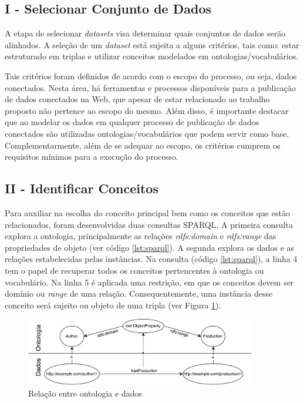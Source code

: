 \subsection{I - Selecionar Conjunto de Dados}
A etapa de selecionar \textit{datasets} visa determinar quais conjuntos de dados serão alinhados. A seleção de um \textit{dataset} está sujeita a alguns critérios, tais como: estar estruturado em triplas e utilizar conceitos modelados em ontologias/vocabulários. 

Tais critérios foram definidos de acordo com o escopo do processo, ou seja, dados conectados. Nesta área, há ferramentas e processos disponíveis para a publicação de dados conectados na Web, que apesar de estar relacionado ao trabalho proposto não pertence ao escopo do mesmo. Além disso, é importante destacar que ao modelar os dados em qualquer processo de publicação de dados conectados são utilizadas ontologias/vocabulários que podem servir como base. Complementarmente, além de se adequar ao escopo, os critérios cumprem os requisitos mínimos para a execução do processo. 

\subsection{II - Identificar Conceitos}
\label{sec:prop_identificar}
Para auxiliar na escolha do conceito principal bem como os conceitos que estão relacionados, foram desenvolvidas duas consultas SPARQL. A primeira consulta explora a ontologia, principalmente as relações \textit{rdfs:domain} e \textit{rdfs:range} das propriedades de objeto (ver código \ref{lst:sparql}). A segunda explora os dados e as relações estabelecidas pelas instâncias.
Na consulta (código \ref{lst:sparql}), a linha 4 tem o papel de recuperar todos os conceitos pertencentes à ontologia ou vocabulário. Na linha 5 é aplicada uma restrição, em que os conceitos devem ser domínio ou \textit{range} de uma relação. Consequentemente, uma instância desse conceito será sujeito ou objeto de uma tripla (ver Figura \ref{fig:subgrafo}).
% 
% 
%
%
\begin{figure}[!h]
	\centering
	\includegraphics[width=0.9\textwidth]{./imagens/subgrafo_semantico.pdf}
	\caption{Relação entre ontologia e dados}
	\label{fig:subgrafo}
\end{figure}

